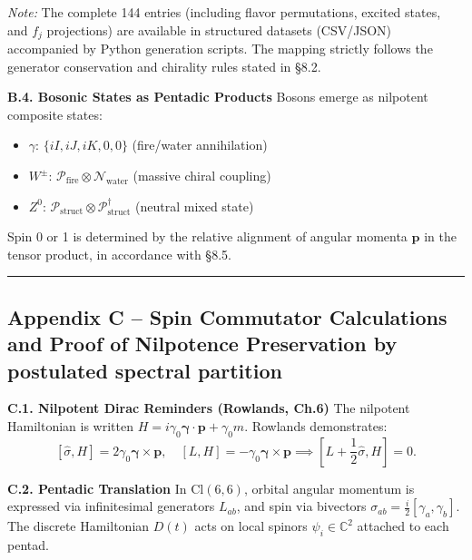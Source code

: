 \documentclass[11pt]{article}
\providecommand{\tightlist}{\setlength{\itemsep}{2pt}\setlength{\parskip}{6pt}}
\let\oldmathcal\mathcal
\renewcommand{\mathcal}[1]{\oldmathcal{#1}}
\providecommand{\tightlist}{%
  \setlength{\itemsep}{2pt}\setlength{\parskip}{6pt}
}
\begin{document}
\emph{Note:} The complete 144 entries (including flavor permutations,
excited states, and \(f_j\) projections) are available in structured
datasets (CSV/JSON) accompanied by Python generation scripts. The
mapping strictly follows the generator conservation and chirality rules
stated in §8.2.

\textbf{B.4. Bosonic States as Pentadic Products} Bosons emerge as
nilpotent composite states:

\begin{itemize}
\tightlist
\item
  \(\gamma\): \(\{iI,iJ,iK,0,0\}\) (fire/water annihilation)
\item
  \(W^\pm\):
  \(\mathcal{P}_{\text{fire}} \otimes \mathcal{N}_{\text{water}}\)
  (massive chiral coupling)
\item
  \(Z^0\):
  \(\mathcal{P}_{\text{struct}} \otimes \mathcal{P}_{\text{struct}}^\dagger\)
  (neutral mixed state)
\end{itemize}

Spin 0 or 1 is determined by the relative alignment of angular momenta
\(\mathbf{p}\) in the tensor product, in accordance with §8.5.

\begin{center}\rule{0.5\linewidth}{0.5pt}\end{center}

\hypertarget{appendix-c-spin-commutator-calculations-and-proof-of-nilpotence-preservation-by-postulated-spectral-partition}{%
\subsection{Appendix C -- Spin Commutator Calculations and Proof of
Nilpotence Preservation by postulated spectral
partition}\label{appendix-c-spin-commutator-calculations-and-proof-of-nilpotence-preservation-by-postulated-spectral-partition}}

\textbf{C.1. Nilpotent Dirac Reminders (Rowlands, Ch.6)} The nilpotent
Hamiltonian is written
\(H = i\gamma_0\boldsymbol{\gamma}\cdot\mathbf{p} + \gamma_0 m\).
Rowlands demonstrates: \[
[\hat{\sigma}, H] = 2\gamma_0 \boldsymbol{\gamma} \times \mathbf{p}, \quad [L, H] = -\gamma_0 \boldsymbol{\gamma} \times \mathbf{p} \implies \left[L + \frac{1}{2}\hat{\sigma}, H\right] = 0.
\]

\textbf{C.2. Pentadic Translation} In \(\text{Cl}(6,6)\), orbital
angular momentum is expressed via infinitesimal generators \(L_{ab}\),
and spin via bivectors \(\sigma_{ab} = \frac{i}{2}[\gamma_a,\gamma_b]\).
The discrete Hamiltonian \(D(t)\) acts on local spinors
\(\psi_i \in \mathbb{C}^2\) attached to each pentad.
\end{document}
